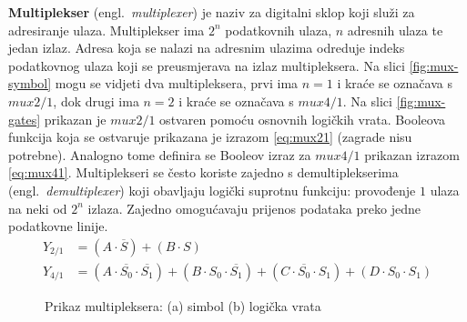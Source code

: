 \documentclass[times, utf8, diplomski]{fer}
\begin{document}
\textbf{Multiplekser} (engl.~\textit{multiplexer}) je naziv za digitalni sklop koji služi za adresiranje ulaza. Multiplekser ima $2^{n}$ podatkovnih ulaza, $n$ adresnih ulaza te jedan izlaz. Adresa koja se nalazi na adresnim ulazima odreduje indeks podatkovnog ulaza koji se preusmjerava na izlaz multipleksera. Na slici \ref{fig:mux-symbol} mogu se vidjeti dva multipleksera, prvi ima $n=1$ i kraće se označava s $mux2/1$, dok drugi ima $n=2$ i kraće se označava s $mux4/1$. Na slici \ref{fig:mux-gates} prikazan je $mux2/1$ ostvaren pomoću osnovnih logičkih vrata. Booleova funkcija koja se ostvaruje prikazana je izrazom \ref{eq:mux21} (zagrade nisu potrebne). Analogno tome definira se Booleov izraz za $mux4/1$ prikazan izrazom \ref{eq:mux41}. Multiplekseri se često koriste zajedno s demultiplekserima (engl.~\textit{demultiplexer}) koji obavljaju logički suprotnu funkciju: provođenje $1$ ulaza na neki od $2^{n}$ izlaza. Zajedno omogućavaju prijenos podataka preko jedne podatkovne linije.
%
\begin{align}
	\label{eq:mux21}
	Y_{2/1} &= (A \cdot \overline{S}) + (B \cdot S) \\
	\label{eq:mux41}
	Y_{4/1} &= (A \cdot \overline{S_{0}} \cdot \overline{S_{1}}) + (B \cdot S_{0} \cdot \overline{S_{1}}) + (C \cdot \overline{S_{0}} \cdot S_{1}) + (D \cdot S_{0} \cdot S_{1})
\end{align}

\begin{figure}[htb]
	\hspace{\fill}
	\caption{Prikaz multipleksera: (a) simbol (b) logička vrata}
	\label{fig:mux}
\end{figure}
\end{document}
